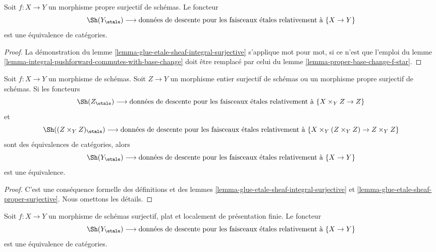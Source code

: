 \begin{lemma}
\label{lemma-glue-etale-sheaf-proper-surjective}
Soit $f : X \to Y$ un morphisme propre surjectif de schémas.
Le foncteur
$$
\Sh(Y_\etale)
\longrightarrow
\text{données de descente pour les faisceaux étales relativement à }\{X \to Y\}
$$
est une équivalence de catégories.
\end{lemma}

\begin{proof}
La démonstration du
lemme \ref{lemma-glue-etale-sheaf-integral-surjective}
s'applique mot pour mot, si ce n'est que l'emploi du
lemme \ref{lemma-integral-pushforward-commutes-with-base-change}
doit être remplacé par celui du
lemme \ref{lemma-proper-base-change-f-star}.
\end{proof}

\begin{lemma}
\label{lemma-glue-etale-sheaf-check-after-base-change}
Soit $f : X \to Y$ un morphisme de schémas. Soit $Z \to Y$ un morphisme
entier surjectif de schémas ou un morphisme propre surjectif de schémas.
Si les foncteurs
$$
\Sh(Z_\etale)
\longrightarrow
\text{données de descente pour les faisceaux étales relativement à }\{X \times_Y Z \to Z\}
$$
et
$$
\Sh((Z \times_Y Z)_\etale)
\longrightarrow
\text{données de descente pour les faisceaux étales relativement à }
\{X \times_Y (Z \times_Y Z) \to Z \times_Y Z\}
$$
sont des équivalences de catégories, alors
$$
\Sh(Y_\etale)
\longrightarrow
\text{données de descente pour les faisceaux étales relativement à }\{X \to Y\}
$$
est une équivalence.
\end{lemma}

\begin{proof}
C'est une conséquence formelle des définitions et des
lemmes \ref{lemma-glue-etale-sheaf-integral-surjective} et
\ref{lemma-glue-etale-sheaf-proper-surjective}. Nous omettons les détails.
\end{proof}

\begin{lemma}
\label{lemma-glue-etale-sheaf-fppf-cover}
Soit $f : X \to Y$ un morphisme de schémas
surjectif, plat et localement de présentation finie.
Le foncteur
$$
\Sh(Y_\etale)
\longrightarrow
\text{données de descente pour les faisceaux étales relativement à }\{X \to Y\}
$$
est une équivalence de catégories.
\end{lemma}


